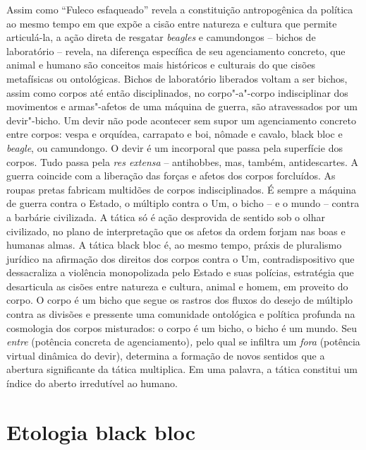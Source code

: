 Assim como ``Fuleco esfaqueado'' revela a constituição antropogênica da
política ao mesmo tempo em que expõe a cisão entre natureza e cultura
que permite articulá-la, a ação direta de resgatar \emph{beagles }e
camundongos -- bichos de laboratório -- revela, na diferença específica
de seu agenciamento concreto, que animal e humano são conceitos mais
históricos e culturais do que cisões metafísicas ou ontológicas. Bichos
de laboratório liberados voltam a ser bichos, assim como corpos até
então disciplinados, no corpo"-a"-corpo indisciplinar dos movimentos e
armas"-afetos de uma máquina de guerra, são atravessados por um
devir"-bicho. Um devir não pode acontecer sem supor um agenciamento
concreto entre corpos: vespa e orquídea, carrapato e boi, nômade e
cavalo, black bloc e \emph{beagle}, ou camundongo. O devir é um
incorporal que passa pela superfície dos corpos. Tudo passa pela
\emph{res extensa} -- antihobbes, mas, também, antidescartes. A guerra
coincide com a liberação das forças e afetos dos corpos forcluídos. As
roupas pretas fabricam multidões de corpos indisciplinados. É sempre a
máquina de guerra contra o Estado, o múltiplo contra o Um, o bicho -- e
o mundo -- contra a barbárie civilizada. A tática só é ação desprovida
de sentido sob o olhar civilizado, no plano de interpretação que os
afetos da ordem forjam nas boas e humanas almas. A tática black bloc é,
ao mesmo tempo, práxis de pluralismo jurídico na afirmação dos direitos
dos corpos contra o Um, contradispositivo que dessacraliza a violência
monopolizada pelo Estado e suas polícias, estratégia que desarticula as
cisões entre natureza e cultura, animal e homem, em proveito do corpo. O
corpo é um bicho que segue os rastros dos fluxos do desejo de múltiplo
contra as divisões e pressente uma comunidade ontológica e política
profunda na cosmologia dos corpos misturados: o corpo é um bicho, o
bicho é um mundo. Seu \emph{entre }(potência concreta de
agenciamento)\emph{,} pelo qual se infiltra um \emph{fora }(potência
virtual dinâmica do devir), determina a formação de novos sentidos que a
abertura significante da tática multiplica. Em uma palavra, a tática
constitui um índice do aberto irredutível ao humano.

\chapter{Etologia black bloc}



